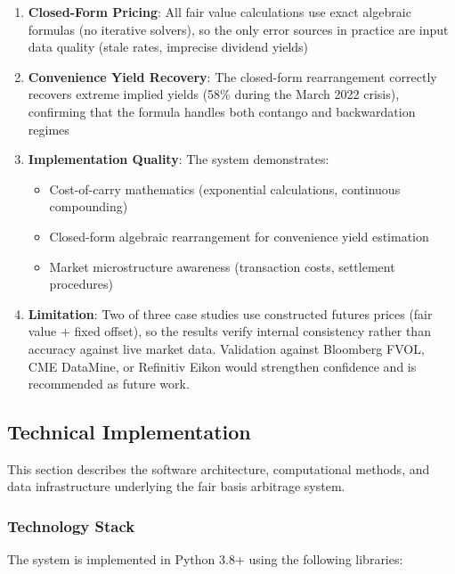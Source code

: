 \documentclass[12pt,a4paper]{article}
\begin{document}
\begin{enumerate}
    \item \textbf{Closed-Form Pricing}: All fair value calculations use exact algebraic formulas (no iterative solvers), so the only error sources in practice are input data quality (stale rates, imprecise dividend yields)
    \item \textbf{Convenience Yield Recovery}: The closed-form rearrangement correctly recovers extreme implied yields (58\% during the March 2022 crisis), confirming that the formula handles both contango and backwardation regimes
    \item \textbf{Implementation Quality}: The system demonstrates:
    \begin{itemize}
        \item Cost-of-carry mathematics (exponential calculations, continuous compounding)
        \item Closed-form algebraic rearrangement for convenience yield estimation
        \item Market microstructure awareness (transaction costs, settlement procedures)
    \end{itemize}
    \item \textbf{Limitation}: Two of three case studies use constructed futures prices (fair value + fixed offset), so the results verify internal consistency rather than accuracy against live market data. Validation against Bloomberg FVOL, CME DataMine, or Refinitiv Eikon would strengthen confidence and is recommended as future work.
\end{enumerate}

\subsection{Technical Implementation}

This section describes the software architecture, computational methods, and data infrastructure underlying the fair basis arbitrage system.

\subsubsection{Technology Stack}

The system is implemented in Python 3.8+ using the following libraries:
\end{document}
